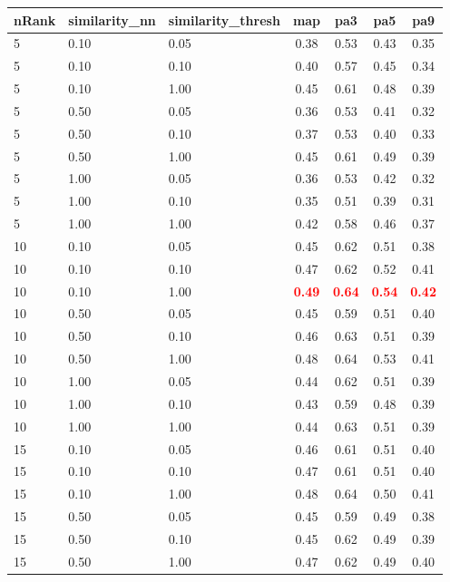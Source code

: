 \documentclass[12pt,a4paper,fleqn]{tufte-handout}
\begin{document}
 
\begin{table}   
\begin{center}   
\scriptsize   
\setlength{\tabcolsep}{.16667em}   
\begin{tabular}{lllcccc}   
nRank & similarity\_nn & similarity\_thresh & map & pa3 & pa5 & pa9 \\   
\hline   
5 & 0.10 & 0.05 & 0.38 & 0.53 & 0.43 & 0.35 \\   
5 & 0.10 & 0.10 & 0.40 & 0.57 & 0.45 & 0.34 \\   
5 & 0.10 & 1.00 & 0.45 & 0.61 & 0.48 & 0.39 \\   
5 & 0.50 & 0.05 & 0.36 & 0.53 & 0.41 & 0.32 \\   
5 & 0.50 & 0.10 & 0.37 & 0.53 & 0.40 & 0.33 \\   
5 & 0.50 & 1.00 & 0.45 & 0.61 & 0.49 & 0.39 \\   
5 & 1.00 & 0.05 & 0.36 & 0.53 & 0.42 & 0.32 \\   
5 & 1.00 & 0.10 & 0.35 & 0.51 & 0.39 & 0.31 \\   
5 & 1.00 & 1.00 & 0.42 & 0.58 & 0.46 & 0.37 \\   
10 & 0.10 & 0.05 & 0.45 & 0.62 & 0.51 & 0.38 \\   
10 & 0.10 & 0.10 & 0.47 & 0.62 & 0.52 & 0.41 \\   
10 & 0.10 & 1.00 & \textbf{\textcolor{red}{0.49}} & \textbf{\textcolor{red}{0.64}} & \textbf{\textcolor{red}{0.54}} & \textbf{\textcolor{red}{0.42}} \\   
10 & 0.50 & 0.05 & 0.45 & 0.59 & 0.51 & 0.40 \\   
10 & 0.50 & 0.10 & 0.46 & 0.63 & 0.51 & 0.39 \\   
10 & 0.50 & 1.00 & 0.48 & 0.64 & 0.53 & 0.41 \\   
10 & 1.00 & 0.05 & 0.44 & 0.62 & 0.51 & 0.39 \\   
10 & 1.00 & 0.10 & 0.43 & 0.59 & 0.48 & 0.39 \\   
10 & 1.00 & 1.00 & 0.44 & 0.63 & 0.51 & 0.39 \\   
15 & 0.10 & 0.05 & 0.46 & 0.61 & 0.51 & 0.40 \\   
15 & 0.10 & 0.10 & 0.47 & 0.61 & 0.51 & 0.40 \\   
15 & 0.10 & 1.00 & 0.48 & 0.64 & 0.50 & 0.41 \\   
15 & 0.50 & 0.05 & 0.45 & 0.59 & 0.49 & 0.38 \\   
15 & 0.50 & 0.10 & 0.45 & 0.62 & 0.49 & 0.39 \\   
15 & 0.50 & 1.00 & 0.47 & 0.62 & 0.49 & 0.40 \\   

\end{tabular}
\end{center}
\end{table}
\end{document}
